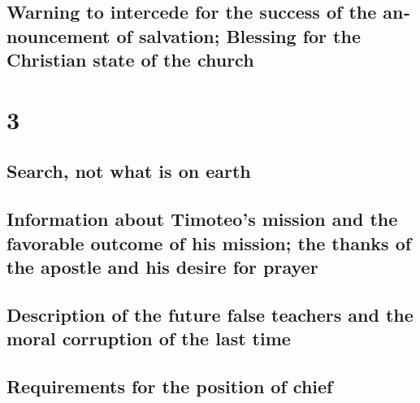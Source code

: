 \begin{paracol}{2}
\switchcolumn
\begin{otherlanguage}{english}

\hypertarget{warning-to-intercede-for-the-success-of-the-announcement-of-salvation-blessing-for-the-christian-state-of-the-church}{%
\subsection{Warning to intercede for the success of the announcement of
salvation; Blessing for the Christian state of the
church}\label{warning-to-intercede-for-the-success-of-the-announcement-of-salvation-blessing-for-the-christian-state-of-the-church}}

\hypertarget{section-5}{%
\section{3}\label{section-5}}

\hypertarget{search-not-what-is-on-earth}{%
\subsection{Search, not what is on
earth}\label{search-not-what-is-on-earth}}

\hypertarget{information-about-timoteos-mission-and-the-favorable-outcome-of-his-mission-the-thanks-of-the-apostle-and-his-desire-for-prayer}{%
\subsection{Information about Timoteo's mission and the favorable
outcome of his mission; the thanks of the apostle and his desire for
prayer}\label{information-about-timoteos-mission-and-the-favorable-outcome-of-his-mission-the-thanks-of-the-apostle-and-his-desire-for-prayer}}

\hypertarget{description-of-the-future-false-teachers-and-the-moral-corruption-of-the-last-time}{%
\subsection{Description of the future false teachers and the moral
corruption of the last
time}\label{description-of-the-future-false-teachers-and-the-moral-corruption-of-the-last-time}}

\hypertarget{requirements-for-the-position-of-chief}{%
\subsection{Requirements for the position of
chief}\label{requirements-for-the-position-of-chief}}


\end{otherlanguage}
\end{paracol}
